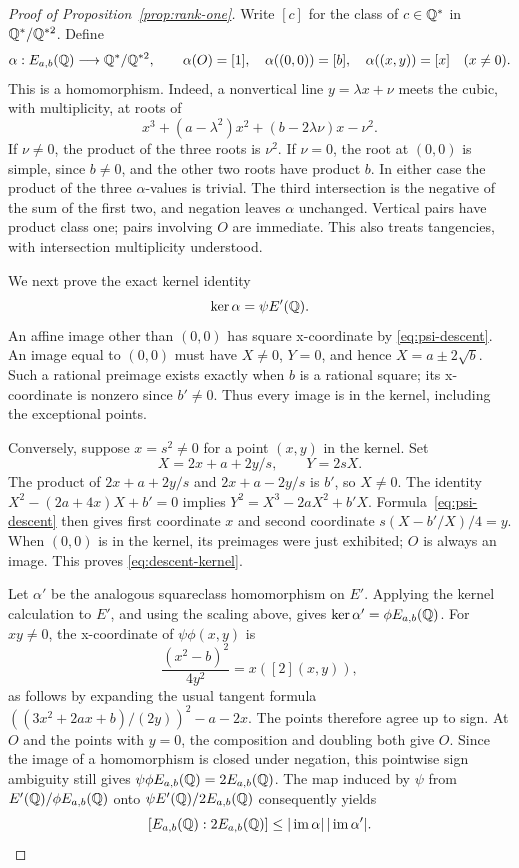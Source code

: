 \begin{proof}[Proof of Proposition~\ref{prop:rank-one}]
Write \([c]\) for the class of \(c\in\mathbb Q^*\) in
\(\mathbb Q^*/\mathbb Q^{*2}\).  Define
\[
 \alpha:E_{a,b}(\mathbb Q)\longrightarrow\mathbb Q^*/\mathbb Q^{*2},\qquad
 \alpha(O)=[1],\quad \alpha((0,0))=[b],\quad
 \alpha((x,y))=[x]\quad(x\ne0).
\]
This is a homomorphism.  Indeed, a nonvertical line
\(y=\lambda x+\nu\) meets the cubic, with multiplicity, at roots of
\[
 x^3+(a-\lambda^2)x^2+(b-2\lambda\nu)x-\nu^2.
\]
If \(\nu\ne0\), the product of the three roots is \(\nu^2\).
If \(\nu=0\), the root at \((0,0)\) is simple, since \(b\ne0\),
and the other two roots have product \(b\).  In either case the
product of the three \(\alpha\)-values is trivial.  The third
intersection is the negative of the sum of the first two, and
negation leaves \(\alpha\) unchanged.  Vertical pairs have product
class one; pairs involving \(O\) are immediate.  This also treats
tangencies, with intersection multiplicity understood.

We next prove the exact kernel identity
\begin{equation}\label{eq:descent-kernel}
 \ker\alpha=\psi E'(\mathbb Q).
\end{equation}
An affine image other than \((0,0)\) has square x-coordinate by
\eqref{eq:psi-descent}.  An image equal to \((0,0)\) must have
\(X\ne0\), \(Y=0\), and hence
\(X=a\pm2\sqrt b\).  Such a rational preimage exists exactly
when \(b\) is a rational square; its x-coordinate is nonzero since
\(b'\ne0\).  Thus every image is in the kernel, including the
exceptional points.

Conversely, suppose \(x=s^2\ne0\) for a point \((x,y)\) in
the kernel.  Set
\[
 X=2x+a+2y/s,\qquad Y=2sX.
\]
The product of \(2x+a+2y/s\) and \(2x+a-2y/s\) is \(b'\),
so \(X\ne0\).  The identity
\(X^2-(2a+4x)X+b'=0\) implies
\(Y^2=X^3-2aX^2+b'X\).  Formula~\eqref{eq:psi-descent}
then gives first coordinate \(x\) and second coordinate
\(s(X-b'/X)/4=y\).  When \((0,0)\) is in the kernel, its
preimages were just exhibited; \(O\) is always an image.
This proves \eqref{eq:descent-kernel}.

Let \(\alpha'\) be the analogous squareclass homomorphism on
\(E'\).  Applying the kernel calculation to \(E'\), and using
the scaling above, gives
\(\ker\alpha'=\phi E_{a,b}(\mathbb Q)\).
For \(xy\ne0\), the x-coordinate of \(\psi\phi(x,y)\) is
\[
 \frac{(x^2-b)^2}{4y^2}=x([2](x,y)),
\]
as follows by expanding the usual tangent formula
\(((3x^2+2ax+b)/(2y))^2-a-2x\).
The points therefore agree up to sign.  At \(O\) and the points
with \(y=0\), the composition and doubling both give \(O\).
Since the image of a homomorphism is closed under negation, this
pointwise sign ambiguity still gives
\(\psi\phi E_{a,b}(\mathbb Q)=2E_{a,b}(\mathbb Q)\).
The map induced by \(\psi\) from \(E'(\mathbb Q)/\phi E_{a,b}(\mathbb Q)\)
onto \(\psi E'(\mathbb Q)/2E_{a,b}(\mathbb Q)\) consequently yields
\begin{equation}\label{eq:descent-index}
 [E_{a,b}(\mathbb Q):2E_{a,b}(\mathbb Q)]
 \le |\operatorname{im}\alpha|\,
      |\operatorname{im}\alpha'|.
\end{equation}


\end{proof}

